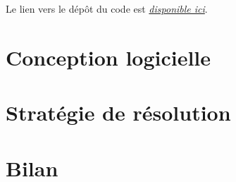 \documentclass[12pt, a4paper]{article}
\begin{document}
\noindent Le lien vers le dépôt du code est \emph{\href{https://github.com/mistertot/SupplyChainProject}{disponible ici}}.


\section{Conception logicielle}


\section{Stratégie de résolution}


\section{Bilan}


\end{document}
